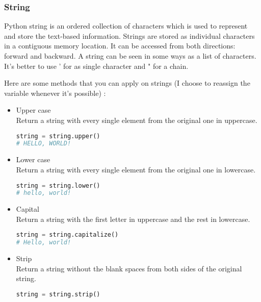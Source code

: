 \documentclass[a4paper, 12pt, titlepage]{scrartcl} %
\begin{document}
\subsubsection{String}
Python string is an ordered collection of characters which is used to represent and store the text-based information. Strings are stored as individual characters in a contiguous memory location. It can be accessed from both directions: forward and backward. A string can be seen in some ways as a list of characters. \\It's better to use ' for as single character and " for a chain.

\vspace{5mm}

Here are some methods that you can apply on strings (I choose to reassign the variable whenever it's possible) : 
\begin{itemize}
\begin{lstlisting}[language=Python]
string = "Hello, world!"
\end{lstlisting} \vspace{5mm}

\item Upper case \\
Return a string with every single element from the original one in uppercase.
\begin{lstlisting}[language=Python]
string = string.upper()
# HELLO, WORLD!
\end{lstlisting} \vspace{5mm}

\item Lower case \\
Return a string with every single element from the original one in lowercase.
\begin{lstlisting}[language=Python]
string = string.lower()
# hello, world!
\end{lstlisting} \vspace{5mm}

\item Capital \\
Return a string with the first letter in uppercase and the rest in lowercase.
\begin{lstlisting}[language=Python]
string = string.capitalize()
# Hello, world!
\end{lstlisting} \vspace{5mm}

\item Strip \\
Return a string without the blank spaces from both sides of the original string.
\begin{lstlisting}[language=Python]
string = string.strip()
\end{lstlisting} \vspace{5mm}


\end{itemize}
\end{document}
